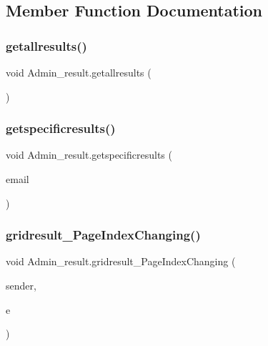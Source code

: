 \subsection{Member Function Documentation}
\mbox{\label{class_admin__result_a2fec56d4ce397f2c9e36135a3efbf4c8}} 
\subsubsection{\texorpdfstring{getallresults()}{getallresults()}}
{\footnotesize\ttfamily void Admin\+\_\+result.\+getallresults (\begin{DoxyParamCaption}{ }\end{DoxyParamCaption})}

\mbox{\label{class_admin__result_a6f34085888eaa6bd6e4d0ec96658a1e3}} 
\subsubsection{\texorpdfstring{getspecificresults()}{getspecificresults()}}
{\footnotesize\ttfamily void Admin\+\_\+result.\+getspecificresults (\begin{DoxyParamCaption}\item[{string}]{email }\end{DoxyParamCaption})}

\mbox{\label{class_admin__result_af04a0c04f4d550a2ae0ae1189ec577ae}} 
\subsubsection{\texorpdfstring{gridresult\_PageIndexChanging()}{gridresult\_PageIndexChanging()}}
{\footnotesize\ttfamily void Admin\+\_\+result.\+gridresult\+\_\+\+Page\+Index\+Changing (\begin{DoxyParamCaption}\item[{object}]{sender,  }\item[{Grid\+View\+Page\+Event\+Args}]{e }\end{DoxyParamCaption})\hspace{0.3cm}{\ttfamily [protected]}}

